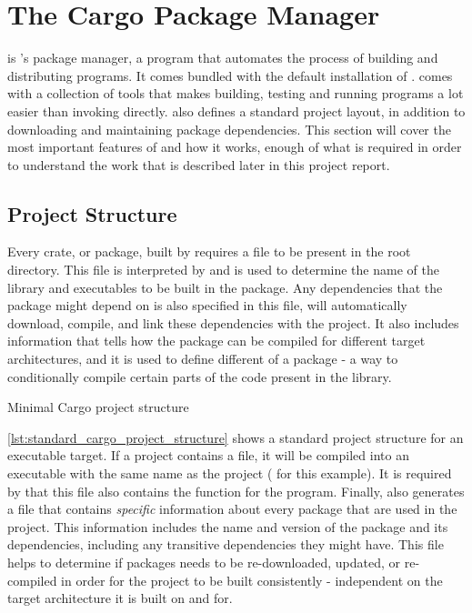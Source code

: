 
\section{The Cargo Package Manager}
\label{sec:cargo}

\cargo is {\rust}'s package manager, a program that automates the process of building and distributing {\rust} programs.
It comes bundled with the default installation of {\rust}.
\cargo comes with a collection of tools that makes building, testing and running {\rust} programs a lot easier than invoking {\rustc} directly.
\cargo also defines a standard {\rust} project layout, in addition to downloading and maintaining package dependencies.
This section will cover the most important features of {\cargo} and how it works, enough of what is required in order to understand the work that is described later in this project report.

\subsection{Project Structure}
\label{ssub:project_structure}

Every crate, or package, built by {\cargo} requires a  file to be present in the root directory.
This file is interpreted by {\cargo} and is used to determine the name of the library and executables to be built in the package.
Any dependencies that the package might depend on is also specified in this file, {\cargo} will automatically download, compile, and link these dependencies with the project.
It also includes information that tells {\cargo} how the package can be compiled for different target architectures, and it is used to define different  of a package - a way to conditionally compile certain parts of the code present in the library.

\begin{listing}
\caption{Minimal Cargo project structure}
\label{lst:standard_cargo_project_structure}
\end{listing}

\autoref{lst:standard_cargo_project_structure} shows a standard {\cargo} project structure for an executable target.
If a project contains a  file, it will be compiled into an executable with the same name as the project ( for this example).
It is required by {\cargo} that this file also contains the {\main} function for the program.
Finally, {\cargo} also generates a  file that contains \emph{specific} information about every package that are used in the project.
This information includes the name and version of the package and its dependencies, including any transitive dependencies they might have.
This file helps {\cargo} to determine if packages needs to be re-downloaded, updated, or re-compiled in order for the project to be built consistently - independent on the target architecture it is built on and for.

